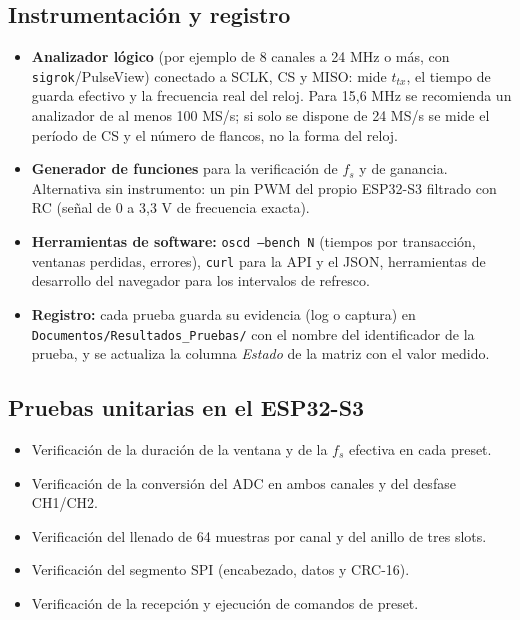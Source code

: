 \documentclass[12pt,a4paper]{article}
\begin{document}
\subsection{Instrumentación y registro}

\begin{itemize}
  \item \textbf{Analizador lógico} (por ejemplo de 8 canales a 24 MHz o más, con \texttt{sigrok}/PulseView) conectado a SCLK, CS y MISO: mide $t_{tx}$, el tiempo de guarda efectivo y la frecuencia real del reloj. Para 15{,}6 MHz se recomienda un analizador de al menos 100 MS/s; si solo se dispone de 24 MS/s se mide el período de CS y el número de flancos, no la forma del reloj.
  \item \textbf{Generador de funciones} para la verificación de $f_s$ y de ganancia. Alternativa sin instrumento: un pin PWM del propio ESP32-S3 filtrado con RC (señal de 0 a 3{,}3 V de frecuencia exacta).
  \item \textbf{Herramientas de software:} \texttt{oscd --bench N} (tiempos por transacción, ventanas perdidas, errores), \texttt{curl} para la API y el JSON, herramientas de desarrollo del navegador para los intervalos de refresco.
  \item \textbf{Registro:} cada prueba guarda su evidencia (log o captura) en \texttt{Documentos/Resultados\_Pruebas/} con el nombre del identificador de la prueba, y se actualiza la columna \emph{Estado} de la matriz con el valor medido.
\end{itemize}

\subsection{Pruebas unitarias en el ESP32-S3}

\begin{itemize}
  \item Verificación de la duración de la ventana y de la $f_s$ efectiva en cada preset.
  \item Verificación de la conversión del ADC en ambos canales y del desfase CH1/CH2.
  \item Verificación del llenado de 64 muestras por canal y del anillo de tres slots.
  \item Verificación del segmento SPI (encabezado, datos y CRC-16).
  \item Verificación de la recepción y ejecución de comandos de preset.
\end{itemize}
\end{document}
